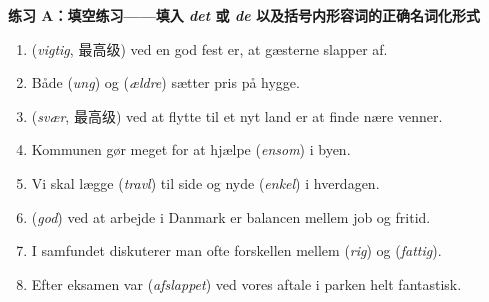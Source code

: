 \textbf{练习 A：填空练习——填入 \textit{det} 或 \textit{de} 以及括号内形容词的正确名词化形式}
\begin{enumerate}
  \item \underline{\hspace{2.6cm}} (\textit{vigtig}, 最高级) ved en god fest er, at gæsterne slapper af.
  \item Både \underline{\hspace{2.4cm}} (\textit{ung}) og \underline{\hspace{2.4cm}} (\textit{ældre}) sætter pris på hygge.
  \item \underline{\hspace{2.6cm}} (\textit{svær}, 最高级) ved at flytte til et nyt land er at finde nære venner.
  \item Kommunen gør meget for at hjælpe \underline{\hspace{2.6cm}} (\textit{ensom}) i byen.
  \item Vi skal lægge \underline{\hspace{2.4cm}} (\textit{travl}) til side og nyde \underline{\hspace{2.4cm}} (\textit{enkel}) i hverdagen.
  \item \underline{\hspace{2.6cm}} (\textit{god}) ved at arbejde i Danmark er balancen mellem job og fritid.
  \item I samfundet diskuterer man ofte forskellen mellem \underline{\hspace{2.4cm}} (\textit{rig}) og \underline{\hspace{2.4cm}} (\textit{fattig}).
  \item Efter eksamen var \underline{\hspace{2.6cm}} (\textit{afslappet}) ved vores aftale i parken helt fantastisk.
\end{enumerate}


